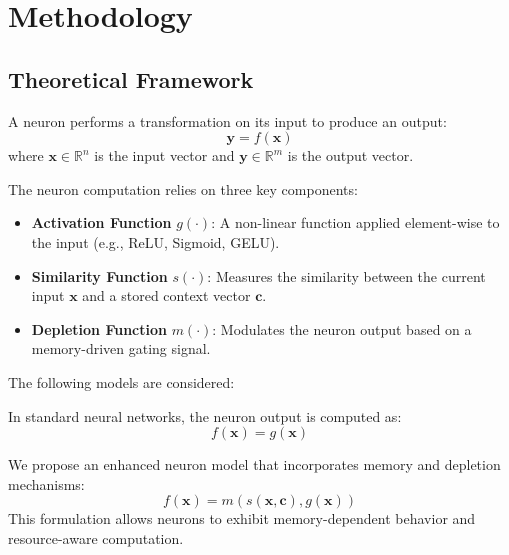 \section{Methodology}

    \subsection{Theoretical Framework}
    
        A neuron performs a transformation on its input to produce an output:
        \begin{equation}
            \mathbf{y} = f(\mathbf{x})
        \end{equation}
        where $\mathbf{x} \in \mathbb{R}^{n}$ is the input vector and $\mathbf{y} \in \mathbb{R}^{m}$ is the output vector.

        The neuron computation relies on three key components:
        \begin{itemize}
            \item \textbf{Activation Function} $g(\cdot)$: A non-linear function applied element-wise to the input (e.g., ReLU, Sigmoid, GELU).
            \item \textbf{Similarity Function} $s(\cdot)$: Measures the similarity between the current input $\mathbf{x}$ and a stored context vector $\mathbf{c}$.
            \item \textbf{Depletion Function} $m(\cdot)$: Modulates the neuron output based on a memory-driven gating signal.
        \end{itemize}

        The following models are considered:

        \begin{tcolorbox}[colback=blue!5!white, colframe=blue!40!black, boxrule=0.8pt, arc=4pt, title=\textbf{Standard Computation}, fonttitle=\normalsize]
            In standard neural networks, the neuron output is computed as:
            \begin{equation}
                f(\mathbf{x}) = g(\mathbf{x})
            \end{equation}
        \end{tcolorbox}

        \begin{tcolorbox}[colback=green!5!white, colframe=green!40!black, boxrule=0.8pt, arc=4pt, title=\textbf{Proposed Enhanced Model}, fonttitle=\normalsize]
            We propose an enhanced neuron model that incorporates memory and depletion mechanisms:
            \begin{equation}
                f(\mathbf{x}) = m\left(s(\mathbf{x}, \mathbf{c}), g(\mathbf{x})\right)
            \end{equation}
            This formulation allows neurons to exhibit memory-dependent behavior and resource-aware computation.
        \end{tcolorbox}


        

